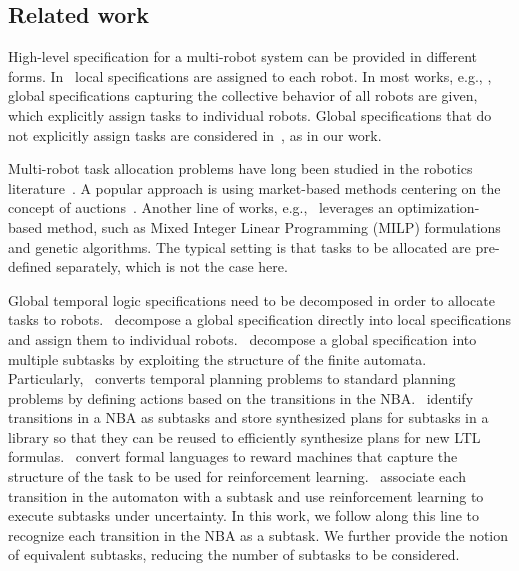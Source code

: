 \documentclass[Afour,sageh,times]{sagej}
\begin{document}
\subsection{Related work}
High-level specification for a multi-robot system can be provided in different forms. In~\cite{guo2015multi,tumova2016multi} local specifications are assigned to  each robot. In most works, e.g., \cite{loizou2004automatic,smith2011optimal,saha2014automated,kantaros2015intermittent,kantaros2017sampling,kantaros2018distributedOpt,kantaros2018sampling,kantaros2018temporal,kantaros2020stylus,xluo_CDC19,luo2019abstraction}, global specifications capturing the collective behavior of all robots are given, which explicitly assign tasks to individual robots. Global specifications that do not explicitly assign tasks are considered in~\cite{kloetzer2011multi,shoukry2017linear,moarref2017decentralized,lacerda2019petri}, as in our work.


Multi-robot task allocation problems have long been studied in the robotics literature~\citep{korsah2013comprehensive,nunes2017taxonomy,gini2017multi}. A popular approach is using market-based methods  centering on the concept of auctions~\cite{zavlanos2007distributed,zavlanos2008distributed,zavlanos2008dynamic,michael2008distributed}. Another line of works, e.g.,~\cite{gombolay2013fast,jones2011time} leverages an optimization-based method, such as Mixed Integer Linear Programming (MILP) formulations and genetic algorithms. The typical setting is that tasks to be allocated are pre-defined separately, which is not the case here.


Global temporal logic specifications need to be decomposed in order to allocate tasks to robots.~\cite{tumova2015decomposition,kantaros2016distributed} decompose a global specification directly into local specifications and assign them to individual robots.~\cite{camacho2017non,xluo_CDC19,camacho2019ltl,schillinger2019hierarchical} decompose a global specification into multiple subtasks by exploiting the structure of the finite automata. Particularly,~\cite{camacho2017non} converts temporal planning problems to standard planning problems by defining actions based on the transitions in the NBA.~\cite{xluo_CDC19} identify transitions in a NBA as subtasks and store synthesized plans for subtasks in a library so that they can be reused to efficiently synthesize plans  for new LTL formulas.~\cite{camacho2019ltl} convert formal languages to reward machines that capture the structure of the task to be used for reinforcement learning.~\cite{schillinger2019hierarchical} associate each transition in the automaton with a subtask and use reinforcement learning to execute subtasks under uncertainty. In this work, we follow along this line to recognize each transition in the NBA as a subtask. We further provide the notion of equivalent subtasks, reducing the number of subtasks to be considered.
\end{document}
